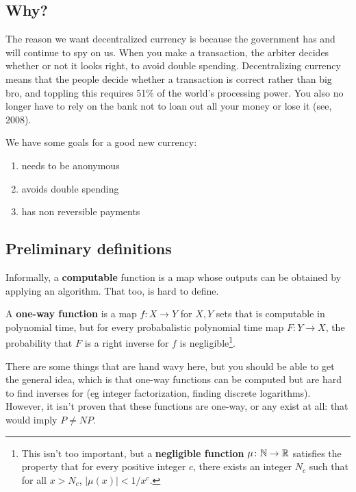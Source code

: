 \subsection*{Why?}
The reason we want decentralized currency is because the government has and will continue to spy on us. When you make a transaction, the arbiter decides whether or not it looks right, to avoid double spending. Decentralizing currency means that the people decide whether a transaction is correct rather than big bro, and toppling this requires 51\% of the world's processing power. You also no longer have to rely on the bank not to loan out all your money or lose it (see, 2008). 

We have some goals for a good new currency:
\begin{enumerate}
        \setlength\itemsep{-0.2em}
    \item needs to be anonymous
    \item avoids double spending
    \item has non reversible payments
\end{enumerate}

\subsection*{Preliminary definitions}
\setcounter{section}{1}
\begin{definition}[]
    Informally, a \textbf{computable} function is a map whose outputs can be obtained by applying an algorithm. That too, is hard to define.
\end{definition}
\begin{definition}[]
    A \textbf{one-way function} is a map $f \colon X \to Y$ for $X,Y$ sets that is computable in polynomial time, but for every probabalistic polynomial time map $F \colon Y \to X$, the probability that $F$ is a right inverse for $f$ is negligible\footnote{This isn't too important, but a \textbf{negligible function} $\mu \colon \mathbb{N} \to \mathbb{R}$ satisfies the property that for every positive integer $c$, there exists an integer $N_c$ such that for all $x>N_c$, $|\mu(x)| < 1 /x^c$.}.
\end{definition}
There are some things that are hand wavy here, but you should be able to get the general idea, which is that one-way functions can be computed but are hard to find inverses for (eg integer factorization, finding discrete logarithms). However, it isn't proven that these functions are one-way, or any exist at all: that would imply $P\neq NP$.

